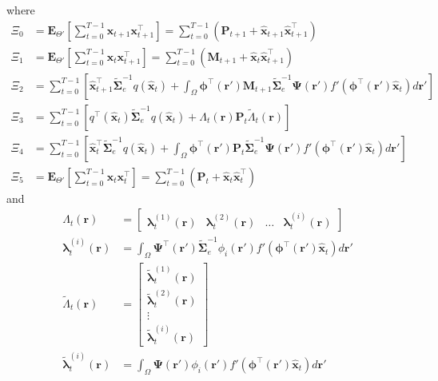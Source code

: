 \documentclass[]{article}
\begin{document}
where 
\begin{align}
	\Xi_{0}&=\mathbf E_{\Theta'}\left[\sum_{t=0}^{T-1}\mathbf x_{t+1}\mathbf x_{t+1}^\top\right]=\sum_{t=0}^{T-1}\left(\mathbf P_{t+1}+\mathbf{\hat x}_{t+1}\mathbf{\hat x}_{t+1}^\top\right)\label{eq:defofXi0} \\
\Xi_{1}&=\mathbf E_{\Theta'}\left[\sum_{t=0}^{T-1}\mathbf x_t\mathbf x_{t+1}^\top\right]=\sum_{t=0}^{T-1}\left(\mathbf M_{t+1}+\mathbf{\hat x}_t\mathbf{\hat x}_{t+1}^\top\right) \label{eq:defofXi1} \\
\Xi_{2}&=\sum_{t=0}^{T-1}\left[ \mathbf{\hat x}_{t+1}^\top\tilde{\boldsymbol\Sigma}_e^{-1}q(\mathbf{\hat x}_t)+\int_\Omega\boldsymbol \phi^\top(\mathbf r') \mathbf M_{t+1} \tilde{\boldsymbol\Sigma}_e^{-1} \boldsymbol{\Psi}(\mathbf{r}') f'(\boldsymbol \phi^\top(\mathbf r')\mathbf {\hat x}_t) d\mathbf{r}'\right] \\	
\Xi_{3}&=\sum_{t=0}^{T-1}\left[q^\top(\mathbf{\hat x}_t)\tilde{\boldsymbol\Sigma}_e^{-1}q(\mathbf{\hat x}_t)+\Lambda_t(\mathbf r)\mathbf P_t \tilde{\Lambda}_t(\mathbf r)\right] \\
 \Xi_{4}&=\sum_{t=0}^{T-1}\left[ \mathbf{\hat x}_{t}^\top\tilde{\boldsymbol\Sigma}_e^{-1}q(\mathbf{\hat x}_t)+\int_\Omega\boldsymbol \phi^\top(\mathbf r') \mathbf P_t \tilde{\boldsymbol\Sigma}_e^{-1}  \boldsymbol{\Psi}(\mathbf{r}') f'(\boldsymbol \phi^\top(\mathbf r')\mathbf {\hat x}_t) d\mathbf{r}'\right] \\
 \Xi_{5}&=\mathbf E_{\Theta'}\left[\sum_{t=0}^{T-1}\mathbf x_t\mathbf x_{t}^\top\right]=\sum_{t=0}^{T-1}\left(\mathbf P_t+\mathbf{\hat x}_t\mathbf{\hat x}_t^\top\right)
\end{align}
and
\begin{align}
	 \Lambda_t(\mathbf r)&=\begin{bmatrix}\boldsymbol \lambda_t^{(1)}(\mathbf r) & \boldsymbol \lambda_t^{(2)}(\mathbf r)& \dots &\boldsymbol \lambda_t^{(i)}(\mathbf r)\end{bmatrix} \label{eq:Lambda}\\
	 \boldsymbol\lambda_t^{(i)}(\mathbf r)&=\int_{\Omega} \boldsymbol \Psi^\top(\mathbf r')\tilde{\boldsymbol\Sigma}_e^{-1}\phi_i(\mathbf r')f'(\boldsymbol\phi^\top(\mathbf r')\mathbf {\hat x}_t)d\mathbf r'\label{eq:lambdai}\\
	\tilde{\Lambda}_t(\mathbf r)&=\begin{bmatrix}\tilde{\boldsymbol \lambda}_t^{(1)}(\mathbf r) \\ \tilde{\boldsymbol \lambda}_t^{(2)}(\mathbf r) \\ \vdots \\ \tilde{\boldsymbol \lambda}_t^{(i)}(\mathbf r)\end{bmatrix} \label{eq:Lambdatilde}\\
	 \tilde{\boldsymbol \lambda}_t^{(i)}(\mathbf r)&=\int_{\Omega} \boldsymbol \Psi(\mathbf r')\phi_i(\mathbf r')f'(\boldsymbol\phi^\top(\mathbf r')\mathbf {\hat x}_t)d\mathbf r' \label{eq:lambdatildei}
\end{align}
\end{document}
